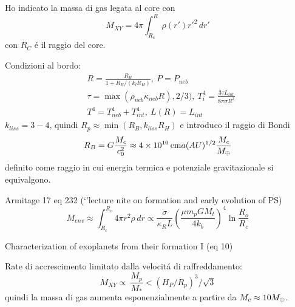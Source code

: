 Ho indicato la massa di gas legata al core con
\begin{equation}
M_{XY}=4\pi\int_{R_c}^R\rho(r')r'^2\,dr'
\end{equation}
con $R_C$ \'e il raggio del core.

Condizioni al bordo:
\begin{align}
&R=\frac{R_B}{1+R_B/(k_lR_H )},\ P=P_{neb}\\
&\tau=\max{(\rho_{neb}\kappa_{neb}R),2/3)},\ T_i^4=\frac{3\tau L_{int}}{8\pi\sigma R^2}\\
&T^4=T_{neb}^4+T_{int}^4,\ L(R)=L_{int}
\end{align}
$k_{liss}=3-4$, quindi $R_p\approx \min{(R_B,k_{liss}R_H)}$ e introduco il raggio di Bondi
\begin{equation}
R_B=G\frac{M_c}{c_0^2}\approx\SI{4e10}{\cm}a(AU)\expy{1/2}\frac{M_c}{\mearth{}}
\end{equation}
definito come raggio in cui energia termica e potenziale gravitazionale si equivalgono.%

\begin{workout}
Armitage 17 eq 232 (`'lecture nite on formation and early evolution of PS)
\begin{equation}
M_{env}\approx\int_{R_c}^{R_o}4\pi r^2\rho\,dr\propto\frac{\sigma}{\kappa_RL}(\frac{\mu m_pGM_t}{4k_b})^4\ln{\frac{R_o}{R_c}}
\end{equation}
\end{workout}

\begin{workout}

\end{workout}


\begin{workout}
Characterization of exoplanets from their formation I (eq 10)
\end{workout}


\begin{workout}
Rate di accrescimento limitato dalla velocit\'a di raffreddamento:
\begin{equation}
\dot{M}_{XY}\propto\ \frac{M_p}{M_*}<(H_P/R_p)^3/\sqrt{3}
\end{equation}
quindi la massa di gas aumenta esponenzialmente a partire da $M_c\approx10M_{\oplus}{}$.
\end{workout}

